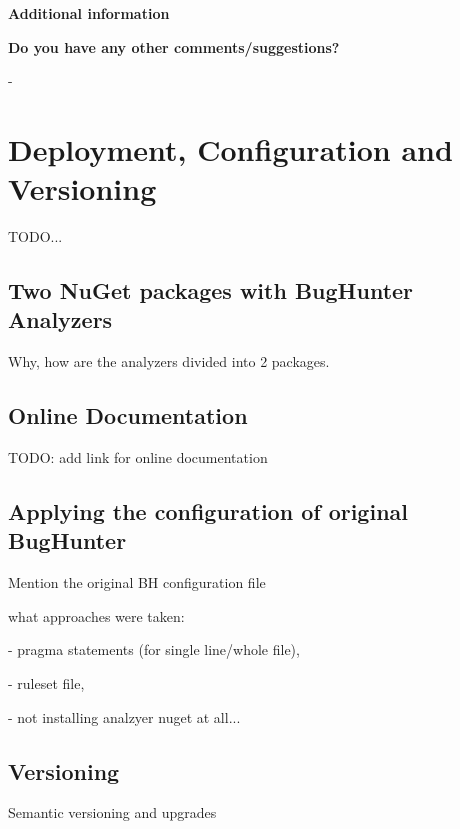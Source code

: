 \documentclass[
  digital, %
  table,   %
  lof,     %
  lot,     %
  oneside,
]{fithesis3}
\begin{document}
\begin{center}
\textbf{Additional information}
\end{center}

\smallskip\noindent
\textbf{Do you have any other comments/suggestions?}

-

\chapter{Deployment, Configuration and Versioning}
\label{appendix:deployment}
TODO...

\section{Two NuGet packages with BugHunter Analyzers}
Why, how are the analyzers divided into 2 packages.

\section{Online Documentation}
TODO: add link for online documentation

\section{Applying the configuration of original BugHunter}
Mention the original BH configuration file

what approaches were taken:

- pragma statements (for single line/whole file), 

- ruleset file, 

- not installing analzyer nuget at all...

\section{Versioning}
Semantic versioning and upgrades
\end{document}
